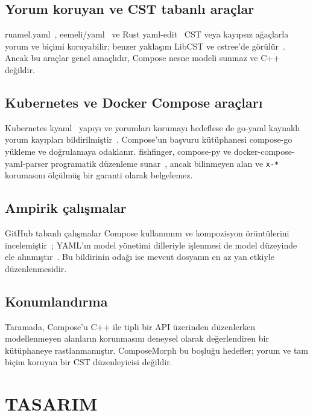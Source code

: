 \documentclass[12pt,a4paper]{article}
\begin{document}
\subsection{Yorum koruyan ve CST tabanlı araçlar}
ruamel.yaml~\cite{ruamelyaml}, eemeli/yaml~\cite{eemeliyaml} ve Rust
yaml-edit~\cite{yamledit_rust} CST veya kayıpsız ağaçlarla yorum ve biçimi
koruyabilir; benzer yaklaşım LibCST ve cstree'de görülür~\cite{libcst,cstree}.
Ancak bu araçlar genel amaçlıdır, Compose nesne modeli sunmaz ve C++ değildir.

\subsection{Kubernetes ve Docker Compose araçları}
Kubernetes kyaml~\cite{kyaml} yapıyı ve yorumları korumayı hedeflese de
go-yaml kaynaklı yorum kayıpları bildirilmiştir~\cite{kustomize_issue259}.
Compose'un başvuru kütüphanesi compose-go~\cite{composego} yükleme ve
doğrulamaya odaklanır. fishfinger, compose-py ve docker-compose-yaml-parser
programatik düzenleme sunar~\cite{fishfinger,composepy,dockercomposeyamlparser},
ancak bilinmeyen alan ve \texttt{x-*} korumasını ölçülmüş bir garanti olarak
belgelemez.

\subsection{Ampirik çalışmalar}
GitHub tabanlı çalışmalar Compose kullanımını ve kompozisyon örüntülerini
incelemiştir~\cite{ibrahim2021dockercompose,eng2024patterns}; YAML'ın model
yönetimi dilleriyle işlenmesi de model düzeyinde ele alınmıştır~\cite{predoaia2024yaml}.
Bu bildirinin odağı ise mevcut dosyanın en az yan etkiyle düzenlenmesidir.

\subsection{Konumlandırma}
Taramada, Compose'u C++ ile tipli bir API üzerinden düzenlerken modellenmeyen
alanların korunmasını deneysel olarak değerlendiren bir kütüphaneye
rastlanmamıştır. ComposeMorph bu boşluğu hedefler; yorum ve tam biçim
koruyan bir CST düzenleyicisi değildir.

\section{TASARIM}
\label{sec:tasarim}
\end{document}
